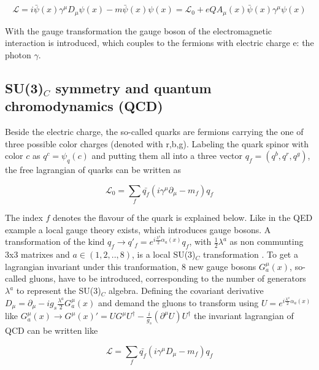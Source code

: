 \begin{equation}
	\label{eq:eq_1_2}
	\mathcal{L} = i\bar{\psi}(x)\gamma^{\mu}D_{\mu}\psi(x) - m\bar{\psi}(x)\psi(x) = \mathcal{L}_{0} + eQA_{\mu}(x)\bar{\psi}(x)\gamma^{\mu}\psi(x)
\end{equation}

With the gauge transformation the gauge boson of the electromagnetic interaction is introduced, which couples to the fermions with electric charge e: the photon $\gamma$.


\subsection{SU(3)${_C}$ symmetry and quantum chromodynamics (\gls{QCD})}
\label{sec:section_1_1_2}

Beside the electric charge, the so-called quarks are fermions carrying the one of three possible color charges (denoted with r,b,g). Labeling the quark spinor with color $c$ as $q^{c} = \psi_{q}(c)$ and putting them all into a three vector $q_{f} = (q^{b}, q^{r}, q^{g})$, the free lagrangian of quarks can be written as

\begin{equation}
	\label{eq:eq_1_3}
	\mathcal{L}_{0} = \sum_{f} \bar{q_{f}}(i\gamma^{\mu}\partial_{\mu} - m_{f})q_{f}
\end{equation}

The index $f$ denotes the flavour of the quark is explained below. Like in the \gls{QED} example a local gauge theory exists, which introduces gauge bosons. A transformation of the kind $q_{f} \rightarrow q'_{f} = e^{i\frac{\lambda^{a}}{2}\alpha_{a}(x)} q_{f}$, with $\frac{1}{2} \lambda^{a}$ as non communting 3x3 matrixes and $a \in (1, 2, .., 8)$, is a local SU(3)$_{C}$ transformation \cite{QCD}. To get a lagrangian invariant under this tranformation, 8 new gauge bosons $G^{\mu}_{a}(x)$, so-called gluons, have to be introduced, corresponding to the number of generators $\lambda^{a}$ to represent the SU(3)$_{C}$ algebra. Defining the covariant derivative $D_{\mu} = \partial_{\mu}-ig_{s}\frac{\lambda^{a}}{2}G^{\mu}_{a}(x)$ and demand the gluons to transform using $U = e^{i\frac{\lambda^{a}}{2}\alpha_{a}(x)}$ like $G^{\mu}_{a}(x) \rightarrow G^{\mu}(x)' = UG^{\mu}U^{\dagger} - \frac{i}{g_s}(\partial^{\mu}U)U^{\dagger}$ the invariant lagrangian of \gls{QCD} can be written like 

\begin{equation}
	\label{eq:eq_1_4}
	\mathcal{L} = \sum_{f} \bar{q_{f}}(i\gamma^{\mu}D_{\mu} - m_{f})q_{f}
\end{equation}


